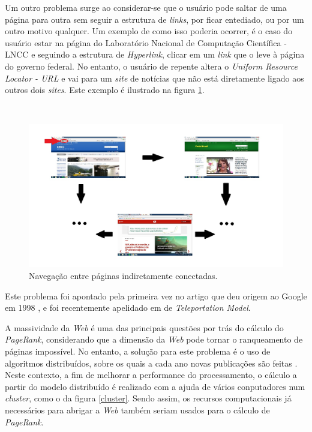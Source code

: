 Um outro problema surge ao considerar-se que o usuário pode saltar de uma página para outra sem seguir a estrutura de \textit{links}, por ficar entediado, ou por um outro motivo qualquer. Um exemplo de como isso poderia ocorrer, é o caso do usuário estar na página do Laboratório Nacional de Computação Científica - LNCC e seguindo a estrutura de \textit{Hyperlink}, clicar em um \textit{link} que o leve à página do governo federal. No entanto, o usuário de repente altera o \textit{Uniform Resource Locator - URL} e vai para um \textit{site} de notícias que não está diretamente ligado aos outros dois \textit{sites}. Este exemplo é ilustrado na figura \ref{tele}.

\
\begin{figure}[!htb]
	\centering
	\includegraphics[scale=0.3]{imagens/tele}
	\caption{Navegação entre páginas indiretamente conectadas.}
	\label{tele}
\end{figure}

\noindent Este problema foi apontado pela primeira vez no artigo que deu origem ao Google em 1998 \cite{brin2012reprint}, e foi recentemente apelidado em \cite{ishii2014pagerank} de \textit{Teleportation Model}.

A massividade da \textit{Web} é uma das principais questões por trás do cálculo do \textit{PageRank}, considerando que a dimensão da \textit{Web} pode tornar o ranqueamento de páginas impossível. No entanto, a solução para este problema é o uso de algoritmos distribuídos, sobre os quais a cada ano novas publicações são feitas \cite{lei2015distributed}. Neste contexto, a fim de melhorar a performance do processamento, o cálculo a partir do modelo distribuído é realizado com a ajuda de vários conputadores num \textit{cluster}, como o da figura \ref{cluster}. Sendo assim, os recursos computacionais já necessários para abrigar a \textit{Web} também seriam usados para o cálculo de \textit{PageRank}.    

